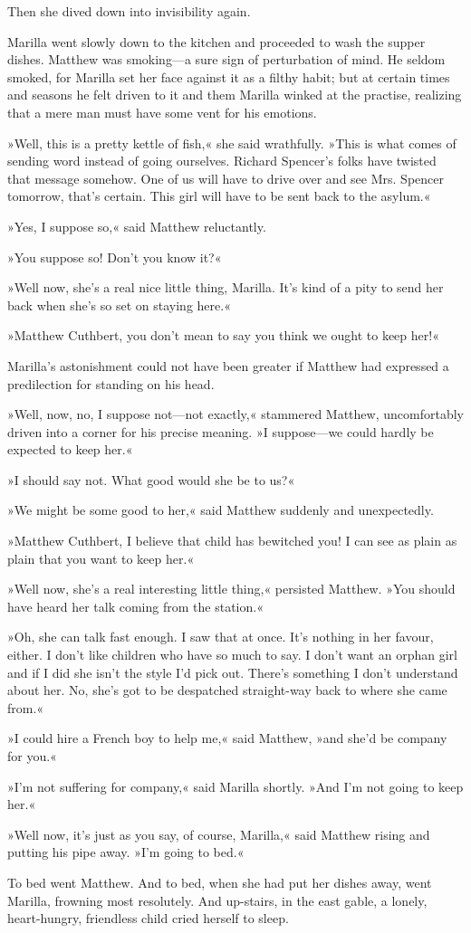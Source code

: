 Then she dived down into invisibility again.

Marilla went slowly down to the kitchen and proceeded to wash the supper dishes. Matthew was smoking—a sure sign of perturbation of mind. He seldom smoked, for Marilla set her face against it as a filthy habit; but at certain times and seasons he felt driven to it and them Marilla winked at the practise, realizing that a mere man must have some vent for his emotions.

»Well, this is a pretty kettle of fish,« she said wrathfully. »This is what comes of sending word instead of going ourselves. Richard Spencer's folks have twisted that message somehow. One of us will have to drive over and see Mrs. Spencer tomorrow, that's certain. This girl will have to be sent back to the asylum.«

»Yes, I suppose so,« said Matthew reluctantly.

»You suppose so! Don't you know it?«

»Well now, she's a real nice little thing, Marilla. It's kind of a pity to send her back when she's so set on staying here.«

»Matthew Cuthbert, you don't mean to say you think we ought to keep her!«

Marilla's astonishment could not have been greater if Matthew had expressed a predilection for standing on his head.

»Well, now, no, I suppose not—not exactly,« stammered Matthew, uncomfortably driven into a corner for his precise meaning. »I suppose—we could hardly be expected to keep her.«

»I should say not. What good would she be to us?«

»We might be some good to her,« said Matthew suddenly and unexpectedly.

»Matthew Cuthbert, I believe that child has bewitched you! I can see as plain as plain that you want to keep her.«

»Well now, she's a real interesting little thing,« persisted Matthew. »You should have heard her talk coming from the station.«

»Oh, she can talk fast enough. I saw that at once. It's nothing in her favour, either. I don't like children who have so much to say. I don't want an orphan girl and if I did she isn't the style I'd pick out. There's something I don't understand about her. No, she's got to be despatched straight-way back to where she came from.«

»I could hire a French boy to help me,« said Matthew, »and she'd be company for you.«

»I'm not suffering for company,« said Marilla shortly. »And I'm not going to keep her.«

»Well now, it's just as you say, of course, Marilla,« said Matthew rising and putting his pipe away. »I'm going to bed.«

To bed went Matthew. And to bed, when she had put her dishes away, went Marilla, frowning most resolutely. And up-stairs, in the east gable, a lonely, heart-hungry, friendless child cried herself to sleep.

